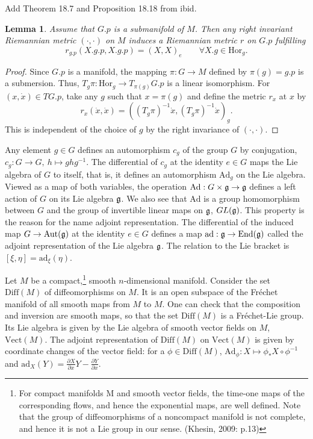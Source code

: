 \documentclass{article}
\theoremstyle{plain}
\newtheorem{lem}[teo]{Lemma}
\theoremstyle{definition}
\numberwithin{equation}{section}
\newcommand{\Diff}{\ensuremath{\mathrm{Diff}}}
\newcommand{\Vect}{\ensuremath{\mathrm{Vect}}}
\newcommand{\Ad}{\ensuremath{\mathrm{Ad}}}
\newcommand{\ad}{\ensuremath{\mathrm{ad}}}
\newcommand{\mf}{\ensuremath{\mathfrak}}
\begin{document}
Add Theorem 18.7 and Proposition 18.18 from ibid.

\begin{lem}
Assume that $G.p$ is a submanifold of $M$. Then any right invariant Riemannian metric $(\cdot,\cdot)$ on $M$ induces a Riemannian metric $r$ on $G.p$ fulfilling
\[
r_{g.p}(X.g.p,X.g.p)=(X,X)_e \qquad\forall X.g\in\mathrm{Hor}_g.
\]
\end{lem}
\begin{proof}
Since $G.p$ is a manifold, the mapping $\pi:G\to M$ defined by $\pi(g)=g.p$ is a submersion. Thus, $T_g\pi: \mathrm{Hor}_g\to T_{\pi(g)}G.p$ is a linear isomorphism. For $(x,\dot{x})\in TG.p$, take any $g$ such that $x=\pi(g)$ and define the metric $r_x$ at $x$ by
\[
r_x(\dot{x},\dot{x})=\left((T_g\pi)^{-1}\dot{x},(T_g\pi)^{-1}\dot{x}\right)_g.
\]
This is independent of the choice of $g$ by the right invariance of $(\cdot,\cdot)$.
\end{proof}

Any element $g\in G$ defines an automorphism $c_g$ of the group $G$ by conjugation, $c_g:G\to G,\ h\mapsto ghg^{-1}$. The differential of $c_g$ at the identity $e\in G$ maps the Lie algebra of $G$ to itself, that is, it defines an automorphism $\Ad_g$ on the Lie algebra. Viewed as a map of both variables, the operation $\Ad:G\times \mf g\to \mf g$ defines a left action of $G$ on its Lie algebra $\mf g$. We also see that $\Ad$ is a group homomorphism between $G$ and the group of invertible linear maps on $\mf g$, $GL(\mf g)$. This property is the reason for the name adjoint representation. The differential of the induced map $G\to\mathrm{Aut}(\mf g)$ at the identity $e\in G$ defines a map $\ad : \mf g\to \mathrm{End}(\mf g)$ called the adjoint representation of the Lie algebra $\mf g$. The relation to the Lie bracket is $[\xi,\eta]=\ad_\xi(\eta)$.

Let $M$ be a compact,\footnote{For compact manifolds M and smooth vector fields, the time-one maps of the corresponding flows, and hence the exponential maps, are well defined. Note that the group of diffeomorphisms of a noncompact manifold is not complete, and hence it is not a Lie group in our sense. (Khesin, 2009: p.13)} 
smooth $n$-dimensional manifold. Consider the
set $\Diff(M)$ of diffeomorphisms on $M$. It is an open subspace of the Fréchet
manifold of all smooth maps from $M$ to $M$. One can check that the composition
and inversion are smooth maps, so that the set $\Diff(M)$ is a Fréchet-Lie group. Its Lie algebra is given by the Lie algebra of smooth vector fields on $M$, $\Vect(M)$. The adjoint representation of $\Diff(M)$ on $\Vect(M)$ is given by coordinate changes of the vector field: for a $\phi\in\Diff(M)$, $\Ad_\phi:X\mapsto \phi_*X\circ \phi^{-1}$ and $\ad_X(Y)=\frac{\partial X}{\partial x}Y-\frac{\partial Y}{\partial x}$.
\end{document}
